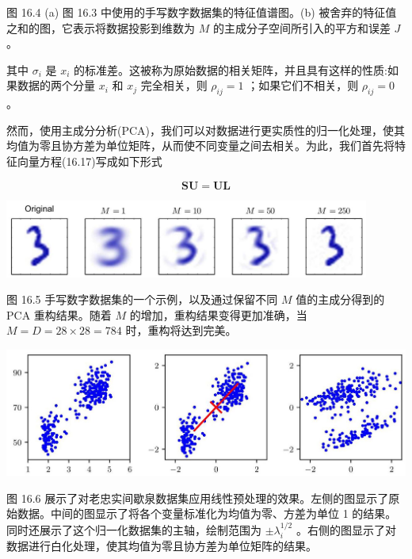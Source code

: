 \documentclass[10pt]{article}
\begin{document}
图 16.4 (a) 图 16.3 中使用的手写数字数据集的特征值谱图。(b) 被舍弃的特征值之和的图，它表示将数据投影到维数为 \(M\) 的主成分子空间所引入的平方和误差 \(J\) 。

其中 \({\sigma }_{i}\) 是 \({x}_{i}\) 的标准差。这被称为原始数据的相关矩阵，并且具有这样的性质:如果数据的两个分量 \({x}_{i}\) 和 \({x}_{j}\) 完全相关，则 \({\rho }_{ij} = 1\) ；如果它们不相关，则 \({\rho }_{ij} = 0\) 。

然而，使用主成分分析(PCA)，我们可以对数据进行更实质性的归一化处理，使其均值为零且协方差为单位矩阵，从而使不同变量之间去相关。为此，我们首先将特征向量方程(16.17)写成如下形式

\[
\mathbf{{SU}} = \mathbf{{UL}} \tag{16.23}
\]

\begin{center}
\includegraphics[max width=0.9\textwidth]{images/0194e279-9b28-703a-88f4-c3ac21e2010d_522_310_1584_1231_264_0.jpg}
\end{center}
\hspace*{3em} 

图 16.5 手写数字数据集的一个示例，以及通过保留不同 \(M\) 值的主成分得到的 PCA 重构结果。随着 \(M\) 的增加，重构结果变得更加准确，当 \(M = D = {28} \times  {28} = {784}\) 时，重构将达到完美。

\begin{center}
\includegraphics[max width=1.0\textwidth]{images/0194e279-9b28-703a-88f4-c3ac21e2010d_523_236_342_1315_416_0.jpg}
\end{center}
\hspace*{3em} 

图 16.6 展示了对老忠实间歇泉数据集应用线性预处理的效果。左侧的图显示了原始数据。中间的图显示了将各个变量标准化为均值为零、方差为单位 1 的结果。同时还展示了这个归一化数据集的主轴，绘制范围为 \(\pm  {\lambda }_{i}^{1/2}\) 。右侧的图显示了对数据进行白化处理，使其均值为零且协方差为单位矩阵的结果。
\end{document}
